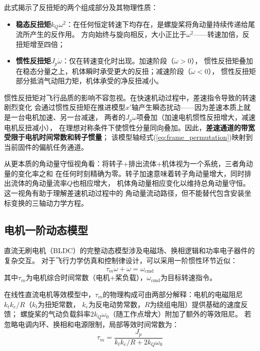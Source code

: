 此式揭示了反扭矩的两个组成部分及其物理性质：
\begin{itemize}
    \item \textbf{稳态反扭矩}$k_Q \omega^2$：在任何恒定转速下均存在，是螺旋桨将角动量持续传递给尾流所产生的反作用。
          方向始终与旋向相反，大小正比于$\omega^2$——转速加倍，反扭矩增至四倍；
    \item \textbf{惯性反扭矩}$J_p \dot{\omega}$：仅在转速变化时出现。加速阶段（$\dot{\omega} > 0$），
         惯性反扭矩叠加在稳态分量之上，机体瞬时承受更大的反扭；减速阶段（$\dot{\omega} < 0$），
         惯性反扭矩部分抵消气动阻力矩，机体承受的净反扭减小。
\end{itemize}

惯性反扭矩对飞行品质的影响不容忽视。在快速机动过程中，差速指令导致的转速剧烈变化
会通过惯性反扭矩在推进模型$x'$轴产生瞬态扰动——因为差速本质上就是一台电机加速、另一台减速，
两者的$J_p \dot{\omega}$项叠加（加速电机惯性反扭增大，减速电机反扭减小），
在理想对称条件下使惯性分量同向叠加。因此，\textbf{差速通道的带宽受限于电机时间常数和转子惯量}；
该模型轴经式(\ref{eq:frame_permutation})映射到当前固件的偏航任务通道。

从更本质的角动量守恒视角看：将转子+排出流体+机体视为一个系统，三者角动量的变化率之和
在任何时刻精确为零。转子加速意味着转子角动量增大，同时排出流体的角动量流率$Q$也相应增大，
机体角动量相应变化以维持总角动量守恒。这一视角有助于理解差速机动过程中的
角动量流动路径，但不能替代包含安装坐标变换的三轴动力学方程。

\subsection{电机一阶动态模型}

直流无刷电机（BLDC）的完整动态模型涉及电磁场、换相逻辑和功率电子器件的复杂交互。
对于飞行力学仿真和控制律设计，可以采用一阶惯性环节近似\cite{ducard2011fault}：
\begin{equation}
    \tau_m \dot{\omega} + \omega = \omega_{\text{cmd}}
    \label{eq:motor_lag}
\end{equation}
其中$\tau_m$为电机综合时间常数（电机+桨负载），$\omega_{\text{cmd}}$为目标转速指令。

在线性直流电机等效模型中，$\tau_m$的物理构成可由两部分解释：电机的电磁阻尼$k_t k_e / R$（$k_t$为扭矩常数，
$k_e$为反电动势常数，$R$为绕组电阻）提供基础的速度反馈；
螺旋桨的气动负载斜率$2 k_Q \omega_0$（随工作点增大）附加了额外的等效阻尼。
若忽略电调内环、换相和电源限制，局部等效时间常数为：
\begin{equation}
    \tau_m = \frac{J_p}{k_t k_e / R + 2 k_Q \omega_0}
    \label{eq:tau_m}
\end{equation}

